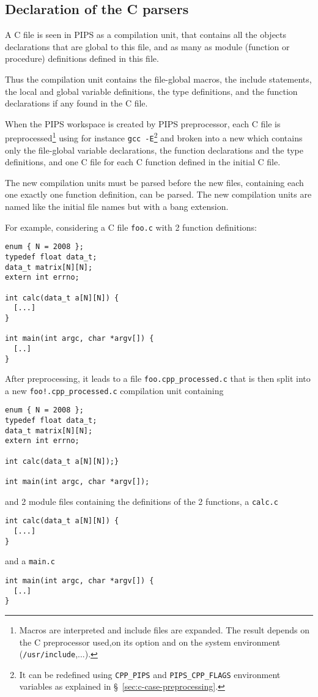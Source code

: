 \documentclass[a4paper]{report}
\begin{document}
\subsection{Declaration of the C parsers}
\label{subsection:declaration-of-the-C-parsers}

A C file is seen in PIPS as a compilation unit, that contains all the
objects declarations that are global to this file, and as many as module
(function or procedure) definitions defined in this file.

Thus the compilation unit contains the file-global macros, the include
statements, the local and global variable definitions, the type
definitions, and the function declarations if any found in the C file.

When the PIPS workspace is created by PIPS preprocessor, each C file is
preprocessed\footnote{Macros are interpreted and include files are
  expanded. The result depends on the C preprocessor used,on its option
  and on the system environment (\texttt{/usr/include},...).} using for
instance \texttt{gcc -E}\footnote{It can be redefined using
  \texttt{CPP\_PIPS} and \texttt{PIPS\_CPP\_FLAGS} environment variables
  as explained in \S~\ref{sec:c-case-preprocessing}.} and broken into a
new  which contains only the file-global variable
declarations, the function declarations and the type definitions, and one
C file for each C function defined in the initial C file.

The new compilation units must be parsed before the new files, containing
each one exactly one function definition, can be parsed. The new
compilation units are named like the initial file names but with a bang
extension.

For example, considering a C file \verb|foo.c| with 2 function
definitions:
\begin{lstlisting}
enum { N = 2008 };
typedef float data_t;
data_t matrix[N][N];
extern int errno;

int calc(data_t a[N][N]) {
  [...]
}

int main(int argc, char *argv[]) {
  [..]
}
\end{lstlisting}
After preprocessing, it leads to a file \verb|foo.cpp_processed.c| that is
then split into a new \verb|foo!.cpp_processed.c| compilation unit
containing
\begin{lstlisting}
enum { N = 2008 };
typedef float data_t;
data_t matrix[N][N];
extern int errno;

int calc(data_t a[N][N]);}

int main(int argc, char *argv[]);
\end{lstlisting}
and 2 module files containing the definitions of the 2 functions, a
\verb|calc.c|
\begin{lstlisting}
int calc(data_t a[N][N]) {
  [...]
}
\end{lstlisting}
and a \verb|main.c|
\begin{lstlisting}
int main(int argc, char *argv[]) {
  [..]
}
\end{lstlisting}
\end{document}
